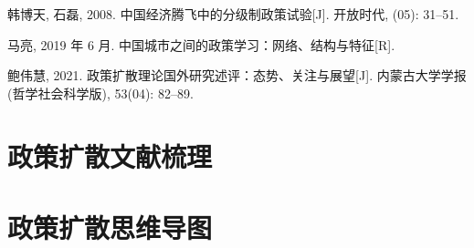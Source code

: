 \documentclass[
  12pt,
]{ctexart}
\newlength{\cslhangindent}
\newlength{\cslentryspacingunit} %
\newenvironment{CSLReferences}[2] %
 {%
  \setlength{\parindent}{0pt}
  \ifodd #1
  \let\oldpar\par
  \def\par{\hangindent=\cslhangindent\oldpar}
  \fi
  \setlength{\parskip}{#2\cslentryspacingunit}
 }%
 {}
\begin{document}
\begin{CSLReferences}{1}{0}
\leavevmode{}%
韩博天, 石磊, 2008. {中国经济腾飞中的分级制政策试验}{[}J{]}. 开放时代, (05): 31--51.

\leavevmode{}%
马亮, 2019 年 6 月. 中国城市之间的政策学习：网络、结构与特征{[}R{]}.

\leavevmode{}%
鲍伟慧, 2021. {政策扩散理论国外研究述评：态势、关注与展望}{[}J{]}. 内蒙古大学学报(哲学社会科学版), 53(04): 82--89.

\end{CSLReferences}

\newpage

\hypertarget{appendix-appendix}{%
\appendix}


\hypertarget{ux653fux7b56ux6269ux6563ux6587ux732eux68b3ux7406}{%
\section{政策扩散文献梳理}\label{ux653fux7b56ux6269ux6563ux6587ux732eux68b3ux7406}}

\newpage

\hypertarget{ux653fux7b56ux6269ux6563ux601dux7ef4ux5bfcux56fe}{%
\section{政策扩散思维导图}\label{ux653fux7b56ux6269ux6563ux601dux7ef4ux5bfcux56fe}}
\end{document}
